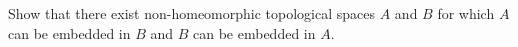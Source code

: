 	\item  Show that there exist non-homeomorphic topological spaces $A$ and $B$ for which $A$ can be embedded in $B$ and $B$ can be embedded in $A$. 
	
	\ea

\begin{comment}

\ExerciseSolution 

\ba
\item Define $f: X \to \R$ by $f(x) = x$. It is clear that $f$ is a bijection. If $O$ is an open set in $\R$, then $f^{-1}(O) = O \cap (0,1)$, which is a relatively open set. So $f$ is continuous. Now let $U$ be an open subset of $(0,1)$. Then $f(U) = U$, which is open in $\R$. 

\item Let $A = (u,v)$ and $B = (a,b) \cup (c,d)$, with $u<v$ and $a<b<c<d$. We will first show that $A$ can be embedded in $B$ and $B$ can be embedded in $A$.

Define $f: A \to B$ by $f(x) = a + \frac{b-a}{v-u}(x-u)$. Since $f$ is a linear function, we know that $f$ is an injection. Also, $f((u,v)) = (a,b)$, so $f$ maps $A$ into $B$. All that remains is to show that $f$ and $f^{-1}$ are continuous. Note that $f^{-1}(x) = u + \frac{v-u}{b-a}(x-a)$ and so $f$ and $f^{-1}$ are both linear functions. Their continuity was established in Exercise \ref{ex:linear_continuous} on page \pageref{ex:linear_continuous}. Thus, $A$ can be embedded into $B$.

Now define $g: B \to A$ by $g(x) = u + \frac{v-u}{d-a}(x-a)$. As in the previous case, $g$ and $g^{-1}$ are linear functions, and $g$ maps $B$ onto $\left(u,u+\frac{v-u}{d-a}(b-a)\right) \cup \left( u+\frac{v-u}{d-a}(c-a), v\right)$. So $B$ can be embedded into $A$. 

It remains to show that $A$ and $B$ are not homeomorphic spaces. To do so, we will use the following result. \\

\noindent \textbf{Claim:} The only subsets of $A$ that are both open and closed are $\emptyset$ and $A$ itself. \\

\noindent \emph{Proof:} We know that $\emptyset$ and $A$ are both open and closed. It remains to show that these are the only such sets. 

Suppose $P$ is a subset of $A$ that is both open and closed. We will show that $P$ is either empty or all of $A$. 


\end{comment}
